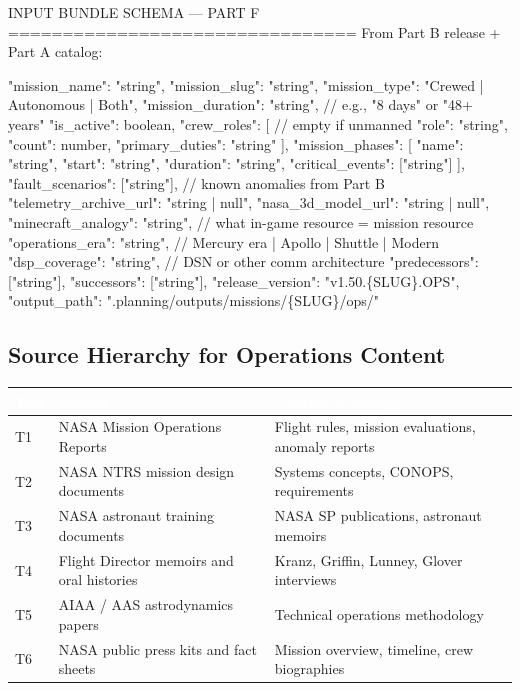 \documentclass[11pt,letterpaper]{article}
\newcommand{\tableheader}[1]{\textbf{\sffamily\textcolor{white}{#1}}}
\begin{document}
\begin{asciibox}
INPUT BUNDLE SCHEMA --- PART F
================================
From Part B release + Part A catalog:

{
  "mission\_name":         "string",
  "mission\_slug":         "string",
  "mission\_type":         "Crewed | Autonomous | Both",
  "mission\_duration":     "string",   // e.g., "8 days" or "48+ years"
  "is\_active":            boolean,
  "crew\_roles": [                      // empty if unmanned
    { "role": "string", "count": number, "primary\_duties": "string" }
  ],
  "mission\_phases": [
    { "name": "string", "start": "string", "duration": "string",
      "critical\_events": ["string"] }
  ],
  "fault\_scenarios": ["string"],       // known anomalies from Part B
  "telemetry\_archive\_url": "string | null",
  "nasa\_3d\_model\_url":    "string | null",
  "minecraft\_analogy":    "string",    // what in-game resource = mission resource
  "operations\_era":       "string",    // Mercury era | Apollo | Shuttle | Modern
  "dsp\_coverage":         "string",    // DSN or other comm architecture
  "predecessors":         ["string"],
  "successors":           ["string"],
  "release\_version":      "v1.50.\{SLUG\}.OPS",
  "output\_path":          ".planning/outputs/missions/\{SLUG\}/ops/"
}
\end{asciibox}

\subsection{Source Hierarchy for Operations Content}

\begin{center}
\begin{tabularx}{\textwidth}{C{1.2cm}L{4.5cm}X}
\toprule
{}
\tableheader{Tier} & \tableheader{Source} & \tableheader{Content Coverage} \\
\midrule
T1 & NASA Mission Operations Reports & Flight rules, mission evaluations, anomaly reports \\
T2 & NASA NTRS mission design documents & Systems concepts, CONOPS, requirements \\
T3 & NASA astronaut training documents & NASA SP publications, astronaut memoirs \\
T4 & Flight Director memoirs and oral histories & Kranz, Griffin, Lunney, Glover interviews \\
T5 & AIAA / AAS astrodynamics papers & Technical operations methodology \\
T6 & NASA public press kits and fact sheets & Mission overview, timeline, crew biographies \\
\bottomrule
\end{tabularx}
\end{center}
\end{document}
